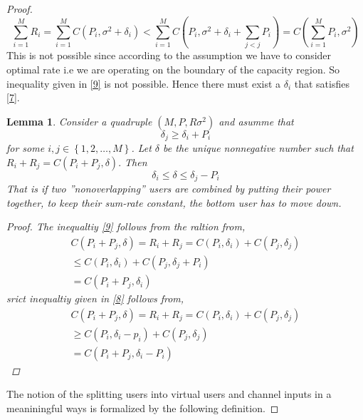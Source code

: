 \documentclass{article}
\newtheorem{lemma}{Lemma}
\begin{document}
\begin{proof}
	
	\begin{equation}
		\sum_{i =1}^{M} R_i = \sum_{i=1}^{M} C(P_i, \sigma^2+\delta_i)<  \sum_{i=1}^{M} C \left( P_i, \sigma^2+\delta_i  + \sum_{j<j} P_i \right) = C \left(  \sum_{i=1}^{M} P_i, \sigma^2 \right) \label{9}
	\end{equation}
This is not possible since according to the assumption we have to consider optimal rate i.e we are operating on the boundary of the capacity region. So inequality given in \eqref{9} is not possible. Hence there must exist a $\delta_i$ that satisfies \eqref{7}.
	\begin{lemma}
		Consider a quadruple $\left( M,P,R \sigma^2 \right)$ and asumme that
		\begin{equation}
			\delta_j \geq \delta_i +P_i \label{8}
		\end{equation}
		for some $i,j \in \left\{ 1,2, \dots, M\right\}$. Let $\delta$ be the unique nonnegative number such that $R_i +R_j = C \left( P_i + P_j , \delta \right).$ Then
		\begin{equation}
			\delta_i \leq \delta \leq \delta_j - P_i \label{9}
		\end{equation}
		That is if two ''nonoverlapping'' users are combined by putting their power together, to keep their sum-rate constant, the bottom user has to move down.
		\begin{proof}
			The  inequaltiy  \eqref{9} follows from the raltion from,
			\begin{align}
				C\left(P_i+P_j, \delta \right) = R_i + R_j = C \left(P_i, \delta_i \right) + C \left(P_j, \delta_j \right) \\ \leq  C \left(P_i, \delta_i \right) + C \left(P_j, \delta_j + P_i \right)  \\  =  C \left(P_i +P_j, \delta_i \right) 
			\end{align}
			srict inequaltiy given in \eqref{8} follows from,
			\begin{align}
				C\left(P_i+P_j, \delta \right) = R_i + R_j = C \left(P_i, \delta_i \right) + C \left(P_j, \delta_j \right)  \\ \geq  C \left(P_i, \delta_i -p_i \right) + C \left(P_j, \delta_j  \right) \\ =  C \left(P_i +P_j, \delta_i-P_i \right) 
			\end{align}
		\end{proof}
	\end{lemma}
	The notion of the splitting users into virtual users and channel inputs  in a meaniningful ways is formalized by the following definition.

\end{proof}
\end{document}
